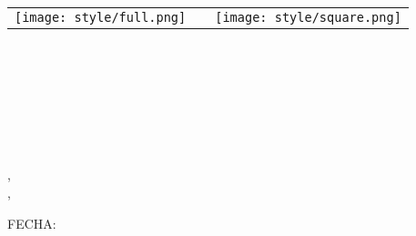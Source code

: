 \begin{titlepage}
    \centering
    \bfseries {
        \null{}
        \vspace{0cm}
        \begin{table}[h]
            \centering
            \begin{tabular}{m{10cm} m{1cm} m{3cm}}
                \vspace{0.2cm}
                \texttt{[image: style/full.png]} &  & \vspace{1.52mm} \texttt{[image: style/square.png]} \\
            \end{tabular}
        \end{table}

        \vspace{3\baselineskip}

        \Large{\ORG{} \\ \vspace{3\baselineskip}}
        \large {
            \AREA{} \\ \vspace{3\baselineskip}
            \subject{} \\ \vspace{2\baselineskip}

            \title{} \\ \vspace{3\baselineskip}

            \authorOne{},~\authorOneId{} \\
            \authorTwo{},~\authorTwoId{} \\
            \vspace{1\baselineskip}
            \group{}

            \vspace{3\baselineskip}
            FECHA:\@ \date{}
        }
    }
\end{titlepage}
